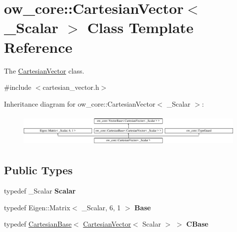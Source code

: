 \hypertarget{classow__core_1_1CartesianVector}{}\section{ow\+\_\+core\+:\+:Cartesian\+Vector$<$ \+\_\+\+Scalar $>$ Class Template Reference}
\label{classow__core_1_1CartesianVector}


The \hyperlink{classow__core_1_1CartesianVector}{Cartesian\+Vector} class.  




{\ttfamily \#include $<$cartesian\+\_\+vector.\+h$>$}

Inheritance diagram for ow\+\_\+core\+:\+:Cartesian\+Vector$<$ \+\_\+\+Scalar $>$\+:\begin{figure}[H]
\begin{center}
\leavevmode
\includegraphics[height=1.642229cm]{d4/d66/classow__core_1_1CartesianVector}
\end{center}
\end{figure}
\subsection*{Public Types}
\begin{DoxyCompactItemize}
\item 
typedef \+\_\+\+Scalar {\bfseries Scalar}\hypertarget{classow__core_1_1CartesianVector_afd69df6f143870b050fff0afda2373d9}{}\label{classow__core_1_1CartesianVector_afd69df6f143870b050fff0afda2373d9}

\item 
typedef Eigen\+::\+Matrix$<$ \+\_\+\+Scalar, 6, 1 $>$ {\bfseries Base}\hypertarget{classow__core_1_1CartesianVector_aa798b094ad0e8a3a5e4a5f97a2e62912}{}\label{classow__core_1_1CartesianVector_aa798b094ad0e8a3a5e4a5f97a2e62912}

\item 
typedef \hyperlink{classow__core_1_1CartesianBase}{Cartesian\+Base}$<$ \hyperlink{classow__core_1_1CartesianVector}{Cartesian\+Vector}$<$ Scalar $>$ $>$ {\bfseries C\+Base}\hypertarget{classow__core_1_1CartesianVector_a7c2a2895155229f2bec78c3017867af1}{}\label{classow__core_1_1CartesianVector_a7c2a2895155229f2bec78c3017867af1}

\end{DoxyCompactItemize}
